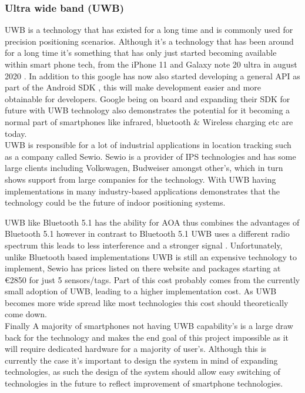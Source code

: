 \subsubsection{Ultra wide band (UWB)}
UWB is a technology that has existed for a long time and is commonly used for precision positioning scenarios. Although it’s a technology that has been around for a long time it’s something that has only just started becoming available within smart phone tech, from the iPhone 11 and Galaxy note 20 ultra in august 2020 \citetemp. In addition to this google has now also started developing a general API as part of the Android SDK \citetemp, this will make development easier and more obtainable for developers. Google being on board and expanding their SDK for future with UWB technology also demonstrates the potential for it becoming a normal part of smartphones like infrared, bluetooth \& Wireless charging etc are today.\\

UWB is responsible for a lot of industrial applications in location tracking such as a company called Sewio. Sewio is a provider of IPS technologies and has some large clients including Volkswagen, Budweiser amongst other’s, which in turn shows support from large companies for the technology. With UWB having implementations in many industry-based applications demonstrates that the technology could be the future of indoor positioning systems. 

UWB like Bluetooth 5.1 has the ability for AOA \citetemp thus combines the advantages of Bluetooth 5.1 however in contrast to Bluetooth 5.1 UWB uses a different radio spectrum this leads to less interference and a stronger signal \citetemp. Unfortunately, unlike Bluetooth based implementations UWB is still an expensive technology to implement, Sewio has prices listed on there website and packages starting at €2850 \citetemp for just 5 sensors/tags. Part of this cost probably comes from the currently small adoption of UWB, leading to a higher implementation cost. As UWB becomes more wide spread like most technologies this cost should theoretically come down.\\

Finally A majority of smartphones not having UWB capability’s is a large draw back for the technology and makes the end goal of this project impossible as it will require dedicated hardware for a majority of user’s. Although  this is currently the case it’s important to design the system in mind of expanding technologies, as such the design of the system should allow easy switching of technologies in the future to reflect improvement of smartphone technologies.
